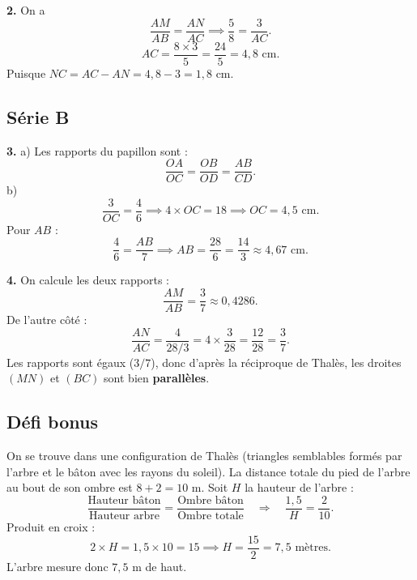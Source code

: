 \documentclass[../main.tex]{subfiles}
\begin{document}
\textbf{2.} On a
\[
\frac{AM}{AB} = \frac{AN}{AC}
\implies \frac{5}{8} = \frac{3}{AC}.
\]
\[
AC = \frac{8 \times 3}{5} = \frac{24}{5} = 4{,}8\text{ cm}.
\]
Puisque $NC = AC - AN = 4{,}8 - 3 = 1{,}8\text{ cm}$.

\subsection*{Série B}

\textbf{3.} a) Les rapports du papillon sont :
\[
\frac{OA}{OC} = \frac{OB}{OD} = \frac{AB}{CD}.
\]
b)
\[
\frac{3}{OC} = \frac{4}{6}
\implies 4 \times OC = 18
\implies OC = 4{,}5\text{ cm}.
\]
Pour $AB$ :
\[
\frac{4}{6} = \frac{AB}{7}
\implies AB = \frac{28}{6} = \frac{14}{3}
\approx 4{,}67\text{ cm}.
\]

\textbf{4.} On calcule les deux rapports :
\[
\frac{AM}{AB} = \frac{3}{7} \approx 0{,}4286.
\]
De l'autre côté :
\[
\frac{AN}{AC} = \frac{4}{28/3}
= 4 \times \frac{3}{28}
= \frac{12}{28}
= \frac{3}{7}.
\]
Les rapports sont égaux ($3/7$), donc d'après la réciproque de Thalès, les droites $(MN)$ et $(BC)$ sont bien \textbf{parallèles}.

\subsection*{Défi bonus}

On se trouve dans une configuration de Thalès (triangles semblables formés par l'arbre et le bâton avec les rayons du soleil).
La distance totale du pied de l'arbre au bout de son ombre est $8 + 2 = 10\text{ m}$.
Soit $H$ la hauteur de l'arbre :
\[
\frac{\text{Hauteur bâton}}{\text{Hauteur arbre}}
= \frac{\text{Ombre bâton}}{\text{Ombre totale}}
\quad\Longrightarrow\quad
\frac{1{,}5}{H} = \frac{2}{10}.
\]
Produit en croix :
\[
2 \times H = 1{,}5 \times 10 = 15
\implies H = \frac{15}{2} = 7{,}5\text{ mètres}.
\]
L'arbre mesure donc $7{,}5\text{ m}$ de haut.
\end{document}
